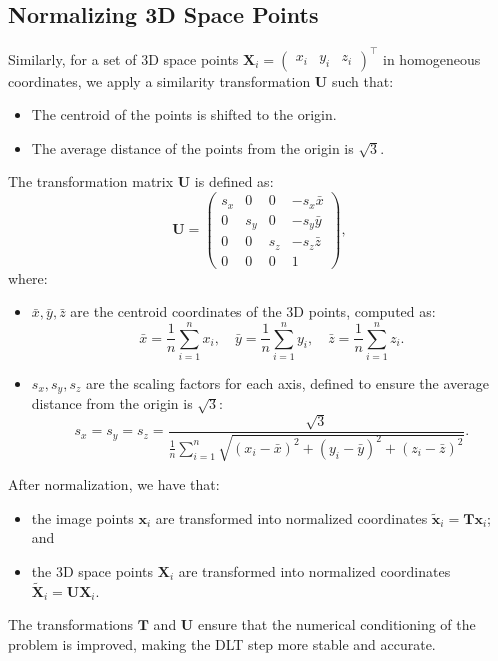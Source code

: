 \documentclass[12pt]{article}
\begin{document}
\subsection{Normalizing 3D Space Points}
Similarly, for a set of 3D space points $ \mathbf{X}_i = \begin{pmatrix} x_i & y_i & z_i \end{pmatrix}^\top $ in homogeneous coordinates, we apply a similarity transformation $ \mathbf{U} $ such that:
\begin{itemize}
    \item The centroid of the points is shifted to the origin.
    \item The average distance of the points from the origin is $\sqrt{3}$.
\end{itemize}

The transformation matrix $ \mathbf{U} $ is defined as:
$$
\mathbf{U} = 
\begin{pmatrix} 
s_x & 0 & 0 & -s_x \bar{x} \\
0 & s_y & 0 & -s_y \bar{y} \\
0 & 0 & s_z & -s_z \bar{z} \\
0 & 0 & 0 & 1
\end{pmatrix},
$$
where:
\begin{itemize}
    \item $ \bar{x}, \bar{y}, \bar{z} $ are the centroid coordinates of the 3D points, computed as:
    $$
    \bar{x} = \frac{1}{n} \sum_{i=1}^n x_i, \quad \bar{y} = \frac{1}{n} \sum_{i=1}^n y_i, \quad \bar{z} = \frac{1}{n} \sum_{i=1}^n z_i.
    $$
    \item $ s_x, s_y, s_z $ are the scaling factors for each axis, defined to ensure the average distance from the origin is $\sqrt{3}$:
    $$
    s_x = s_y = s_z = \frac{\sqrt{3}}{\displaystyle\frac{1}{n} \sum_{i=1}^n \sqrt{(x_i - \bar{x})^2 + (y_i - \bar{y})^2 + (z_i - \bar{z})^2}}.
    $$
\end{itemize}

After normalization, we have that:
\begin{itemize}
    \item the image points $ \mathbf{x}_i $ are transformed into normalized coordinates $ \tilde{\mathbf{x}}_i = \mathbf{T} \mathbf{x}_i $; and
    \item the 3D space points $ \mathbf{X}_i $ are transformed into normalized coordinates $ \tilde{\mathbf{X}}_i = \mathbf{U} \mathbf{X}_i $.
\end{itemize}
The transformations $ \mathbf{T} $ and $ \mathbf{U} $ ensure that the numerical conditioning of the problem is improved, making the DLT step more stable and accurate.
\end{document}
